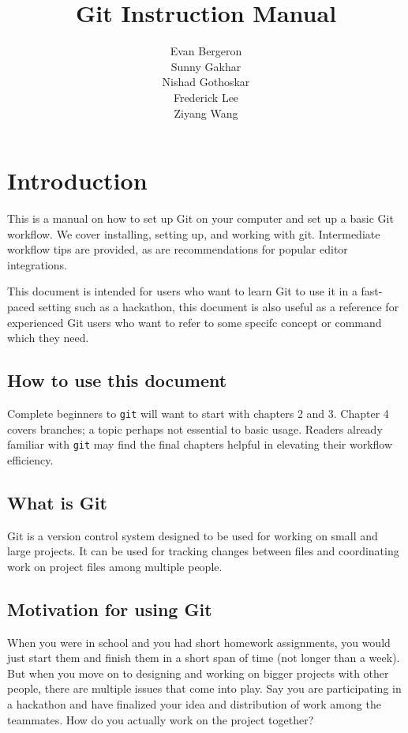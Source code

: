 \documentclass[12pt]{report}
\title{Git Instruction Manual}
\author{Evan Bergeron\\
Sunny Gakhar\\
Nishad Gothoskar\\
Frederick Lee\\
Ziyang Wang
}
\begin{document}
\maketitle

\tableofcontents
\newpage
\chapter{Introduction}

This is a manual on how to set up Git on your computer and set up a basic Git workflow. We cover installing, setting up, and working with git. Intermediate workflow tips are provided, as are recommendations for popular editor integrations.

This document is intended for users who want to learn Git to use it in a fast-paced setting such as a hackathon, this document is also useful as a reference for experienced Git users who want to refer to some specifc concept or command which they need.

\section{How to use this document}

Complete beginners to \texttt{git} will want to start with chapters 2 and 3. Chapter 4 covers branches; a topic perhaps not essential to basic usage. Readers already familiar with \texttt{git} may find the final chapters helpful in elevating their workflow efficiency.

\section{What is Git}

Git is a version control system designed to be used for working on small and large projects. It can be used for tracking changes between files and coordinating work on project files among multiple people.

\section{Motivation for using Git}
When you were in school and you had short homework assignments, you would just start them and finish them in a short span of time (not longer than a week). But when you move on to designing and working on bigger projects with other people, there are multiple issues that come into play. Say you are participating in a hackathon and have finalized your idea and distribution of work among the teammates. How do you actually work on the project together? 
\end{document}
